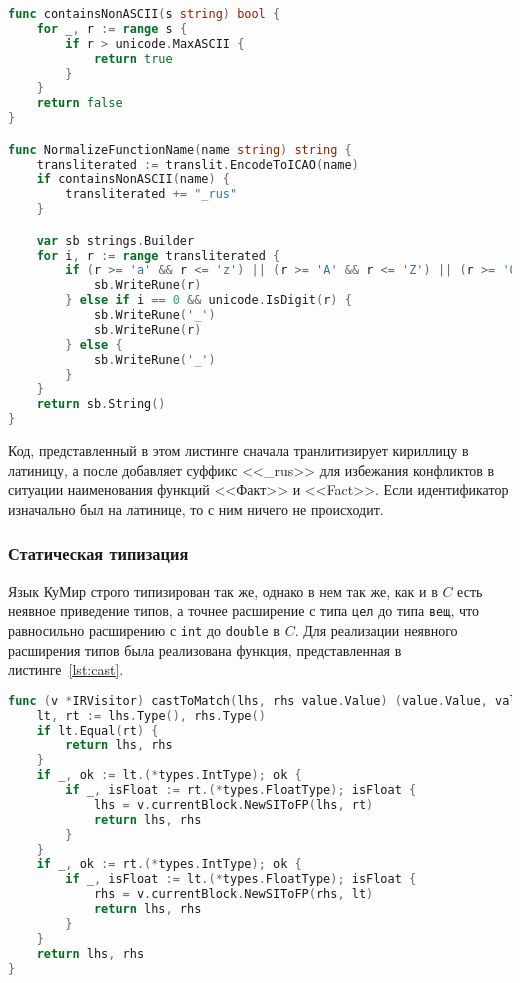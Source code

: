 \begin{lstlisting}[language=go, caption={Подготовка имени к использованию в дальнейшем коде}, label=lst:normal]
func containsNonASCII(s string) bool {
	for _, r := range s {
		if r > unicode.MaxASCII {
			return true
		}
	}
	return false
}

func NormalizeFunctionName(name string) string {
	transliterated := translit.EncodeToICAO(name)
	if containsNonASCII(name) {
		transliterated += "_rus"
	}

	var sb strings.Builder
	for i, r := range transliterated {
		if (r >= 'a' && r <= 'z') || (r >= 'A' && r <= 'Z') || (r >= '0' && r <= '9') || r == '_' {
			sb.WriteRune(r)
		} else if i == 0 && unicode.IsDigit(r) {
			sb.WriteRune('_')
			sb.WriteRune(r)
		} else {
			sb.WriteRune('_')
		}
	}
	return sb.String()
}
\end{lstlisting}

Код, представленный в этом листинге сначала транлитизирует кириллицу в латиницу, а после добавляет суффикс <<\_rus>> для избежания конфликтов в ситуации наименования функций <<Факт>> и <<Fact>>. Если идентификатор изначально был на латинице, то с ним ничего не происходит.

\subsubsection*{Статическая типизация}

Язык КуМир строго типизирован так же, однако в нем так же, как и в $C$ есть неявное приведение типов, а точнее расширение с типа \texttt{цел} до типа \texttt{вещ}, что равносильно расширению с \texttt{int} до \texttt{double} в $C$. Для реализации неявного расширения типов была реализована функция, представленная в листинге~\ref{lst:cast}. 

\begin{lstlisting}[language=go, caption={Пример реализации метода VisitBasicType для определения типа скалярной переменной}, label=lst:cast]
func (v *IRVisitor) castToMatch(lhs, rhs value.Value) (value.Value, value.Value) {
	lt, rt := lhs.Type(), rhs.Type()
	if lt.Equal(rt) {
		return lhs, rhs
	}
	if _, ok := lt.(*types.IntType); ok {
		if _, isFloat := rt.(*types.FloatType); isFloat {
			lhs = v.currentBlock.NewSIToFP(lhs, rt)
			return lhs, rhs
		}
	}
	if _, ok := rt.(*types.IntType); ok {
		if _, isFloat := lt.(*types.FloatType); isFloat {
			rhs = v.currentBlock.NewSIToFP(rhs, lt)
			return lhs, rhs
		}
	}
	return lhs, rhs
}
\end{lstlisting}

